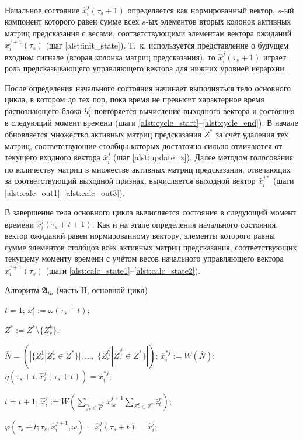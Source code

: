 Начальное состояние $\hat x_i^j(\tau_s+1)$ определяется как нормированный вектор, $s$-ый компонент которого равен сумме всех $s$-ых элементов вторых колонок активных матриц предсказания с весами, соответствующими элементам вектора ожиданий $\hat x_i^{j+1}(\tau_s)$ (шаг \ref{alst:init_state}). Т.~к. используется представление о будущем входном сигнале (вторая колонка матриц предсказания), то $\hat x_i^j(\tau_s+1)$ играет роль предсказывающего управляющего вектора для нижних уровней иерархии.

После определения начального состояния начинает выполняться тело основного цикла, в котором до тех пор, пока время не превысит характерное время распознающего блока $h_i^j$ повторяется вычисление выходного вектора и состояния в следующий момент времени (шаги \ref{alst:cycle_start}--\ref{alst:cycle_end}). В начале обновляется множество активных матриц предсказания $Z^*$ за счёт удаления тех матриц, соответствующие столбцы которых достаточно сильно отличаются от текущего входного вектора $\bar x_i^j$ (шаг \ref{alst:update_z}). Далее методом голосования по количеству матриц в множестве активных матриц предсказания, отвечающих за соответствующий выходной признак, вычисляется выходной вектор $\bar x_i^{j*}$ (шаги \ref{alst:calc_out1}--\ref{alst:calc_out3}).
		
В завершение тела основного цикла вычисляется состояние в следующий момент времени $\hat x_i^j(\tau_s+t+1)$. Как и на этапе определения начального состояния, вектор ожиданий равен нормированному вектору, элементы которого равны сумме элементов столбцов всех активных матриц предсказания, соответствующих текущему моменту времени с учётом весов начального управляющего вектора $\hat x_i^{j+1}(\tau_s)$ (шаги \ref{alst:calc_state1}--\ref{alst:calc_state2}).
\begin{algorithm}[H]
	\caption{Алгоритм $\mathfrak{A}_{th}$ (часть II, основной цикл)}\label{alg:th_cycle}
	\begin{algorithmic}[1]
		\State $t=1$;
		 \label{alst:cycle_start}
			\State $\bar{x}_i^j:=\omega(\tau_s+t)$;

				 \label{alst:update_z}
					\State $Z^*:=Z^*\setminus\{Z_r^k\}$;
				\EndIf
			\EndFor

			\State $\bar N=(|\{Z_r^1|Z_r^1\in Z^*\}|,\dots,|\{Z_r^{l_i^j}|Z_r^{l_i^j}\in Z^*\}|)$; \label{alst:calc_out1}
			\State $\bar{x}_i^{*j}:=W(\bar N)$; \label{alst:calc_out2}
			\State $\eta(\tau_s+t, \hat{x}_i^j(\tau_s+t))=\bar{x}_i^{*j}$; \label{alst:calc_out3}
						
			\State $t=t+1$;
				\State $\hat{x}_i^j:=W(\sum_{\hat f_k\in\hat F^*}\hat x_{ik}^{j+1}\sum_{Z_r^k\in Z^*}\bar z_t^r)$; \label{alst:calc_state1}
							
				\State $\varphi(\tau_s+t;\tau_s,\hat{x}_i^{j+1}, \omega)=\hat{x}_i^j(\tau_s+t)=\hat{x}_i^j$; \label{alst:calc_state2}
			\EndIf
		\EndWhile \label{alst:cycle_end}
	\end{algorithmic}
\end{algorithm}


